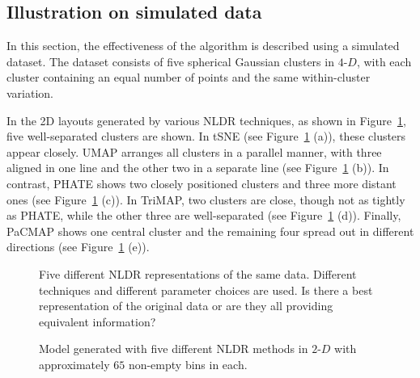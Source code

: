 \documentclass[
  12pt]{article}
\begin{document}
\subsection{Illustration on simulated
data}\label{illustration-on-simulated-data}

In this section, the effectiveness of the algorithm is described using a
simulated dataset. The dataset consists of five spherical Gaussian
clusters in \(4\text{-}D\), with each cluster containing an equal number
of points and the same within-cluster variation.

In the 2D layouts generated by various NLDR techniques, as shown in
Figure~\ref{fig-NLDR-variety-gau}, five well-separated clusters are
shown. In tSNE (see Figure~\ref{fig-NLDR-variety-gau} (a)), these
clusters appear closely. UMAP arranges all clusters in a parallel
manner, with three aligned in one line and the other two in a separate
line (see Figure~\ref{fig-NLDR-variety-gau} (b)). In contrast, PHATE
shows two closely positioned clusters and three more distant ones (see
Figure~\ref{fig-NLDR-variety-gau} (c)). In TriMAP, two clusters are
close, though not as tightly as PHATE, while the other three are
well-separated (see Figure~\ref{fig-NLDR-variety-gau} (d)). Finally,
PaCMAP shows one central cluster and the remaining four spread out in
different directions (see Figure~\ref{fig-NLDR-variety-gau} (e)).

\begin{figure}[H]


\caption{\label{fig-NLDR-variety-gau}Five different NLDR representations
of the same data. Different techniques and different parameter choices
are used. Is there a best representation of the original data or are
they all providing equivalent information?}

\end{figure}%

\begin{figure}[H]


\caption{\label{fig-trimesh-gau}Model generated with five different NLDR
methods in \(2\text{-}D\) with approximately \(65\) non-empty bins in
each.}

\end{figure}%
\end{document}
